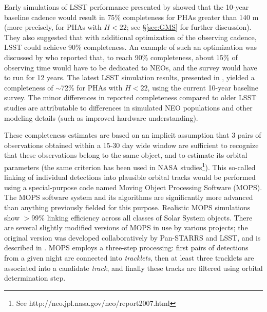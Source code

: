 Early simulations of LSST performance presented by \cite{IvezicNEO2007} showed that the 10-year baseline 
cadence would result in 75\% completeness for PHAs greater than 140 m (more  precisely, for PHAs with 
$H<22$; see \S\ref{sec:GMS} for further discussion). They also suggested that with additional optimization of the 
observing cadence, LSST could achieve 90\% completeness. An example of such an optimization was discussed
by \cite{LSSToverview} who reported that, to reach 90\% completeness, about 15\% of observing time would 
have to be dedicated to NEOs, and the survey would have to run for 12 years.  
The latest LSST simulation results, presented in \cite{JJI2016}, yielded a completeness of $\sim$72\% for
PHAs with $H<22$, using the current 10-year baseline survey. The minor differences in reported completeness
compared to older LSST studies are attributable to differences in simulated NEO populations and other modeling 
details (such as improved hardware understanding). 

These completeness estimates are based on an implicit assumption that 3 pairs of observations
obtained within a 15-30 day wide window are sufficient to recognize that these observations belong 
to the same object, and to estimate its orbital parameters (the same criterion has been used in NASA 
studies\footnote{See http://neo.jpl.nasa.gov/neo/report2007.html}). 
This so-called linking of individual detections into plausible orbital tracks would be performed using a 
special-purpose code named Moving Object Processing Software (MOPS). The MOPS software system and its 
algorithms are significantly more advanced than anything previously fielded for this purpose. Realistic 
MOPS simulations show $>$99\% linking efficiency across all classes of Solar System objects. There are several 
slightly modified versions of MOPS in use by various projects; the original version was developed collaboratively 
by Pan-STARRS and LSST, and is described in \cite{denneau13}. MOPS employs a three-step processing: first pairs 
of detections from a given night are connected into {\it tracklets}, then at least three tracklets are associated 
into a candidate {\it track}, and finally these tracks are filtered using orbital determination step. 

